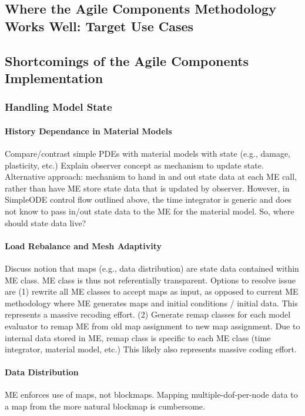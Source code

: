 \documentclass[10pt]{article}
\theoremstyle{plain}
\theoremstyle{definition}
\theoremstyle{remark}
\numberwithin{equation}{section}
\begin{document}
\subsection{Where the Agile Components Methodology Works Well: Target Use Cases}

\subsection{Shortcomings of the Agile Components Implementation}

\subsubsection{Handling Model State}

\paragraph{History Dependance in Material Models}
Compare/contrast simple PDEs with material models with state (e.g., damage, plasticity, etc.) Explain observer concept as mechanism to update state. Alternative approach: mechanism to hand in and out state data at each ME call, rather than have ME store state data that is updated by observer. However, in SimpleODE control flow outlined above, the time integrator is generic and does not know to pass in/out state data to the ME for the material model. So, where should state data live?

\paragraph{Load Rebalance and Mesh Adaptivity}
Discuss notion that maps (e.g., data distribution) are state data contained within ME class. ME class is thus not referentially transparent. Options to resolve issue are (1) rewrite all ME classes to accept maps as input, as opposed to current ME methodology where ME generates maps and initial conditions / initial data. This represents a massive recoding effort. (2) Generate remap classes for each model evaluator to remap ME from old map assignment to new map assignment. Due to internal data stored in ME, remap class is specific to each ME class (time integrator, material model, etc.) This likely also represents massive coding effort. 

\paragraph{Data Distribution}
ME enforces use of maps, not blockmaps. Mapping multiple-dof-per-node data to a map from the more natural blockmap is cumbersome. 
\end{document}
